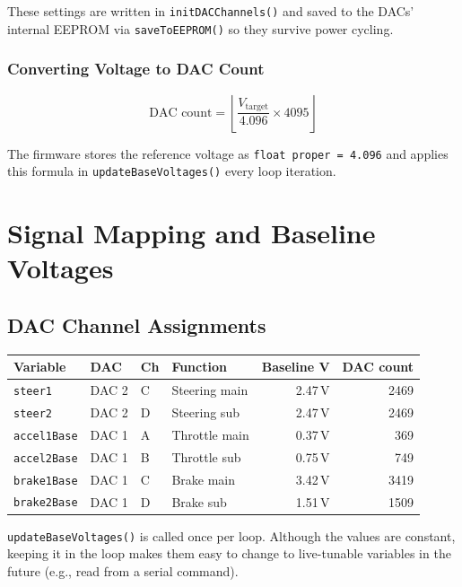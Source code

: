 \documentclass[12pt, letterpaper]{article}
\begin{document}
These settings are written in \texttt{initDACChannels()} and saved to the DACs'
internal EEPROM via \texttt{saveToEEPROM()} so they survive power cycling.

\subsubsection*{Converting Voltage to DAC Count}

\[
  \text{DAC count} = \left\lfloor \frac{V_{\text{target}}}{4.096} \times 4095
  \right\rfloor
\]

The firmware stores the reference voltage as \texttt{float proper = 4.096} and
applies this formula in \texttt{updateBaseVoltages()} every loop iteration.

\section{Signal Mapping and Baseline Voltages}

\subsection{DAC Channel Assignments}

\begin{center}
\begin{tabular}{llllrr}
  \toprule
  \textbf{Variable} & \textbf{DAC} & \textbf{Ch} & \textbf{Function}
    & \textbf{Baseline V} & \textbf{DAC count} \\
  \midrule
  \texttt{steer1}   & DAC 2 & C & Steering main  & 2.47\,V & 2469 \\
  \texttt{steer2}   & DAC 2 & D & Steering sub   & 2.47\,V & 2469 \\
  \texttt{accel1Base} & DAC 1 & A & Throttle main & 0.37\,V & 369  \\
  \texttt{accel2Base} & DAC 1 & B & Throttle sub  & 0.75\,V & 749  \\
  \texttt{brake1Base} & DAC 1 & C & Brake main    & 3.42\,V & 3419 \\
  \texttt{brake2Base} & DAC 1 & D & Brake sub     & 1.51\,V & 1509 \\
  \bottomrule
\end{tabular}
\end{center}

\begin{notebox}
\texttt{updateBaseVoltages()} is called once per loop.  Although the values are
constant, keeping it in the loop makes them easy to change to live-tunable
variables in the future (e.g., read from a serial command).
\end{notebox}
\end{document}
